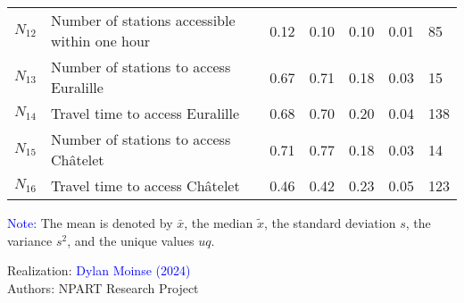 \begin{table}[h!]
{\begin{tabular}{p{}p{}p{}p{}p{}p{}p{}}
\small{\(N_{12}\)} & \small{Number of stations accessible within one hour} & \small{0.12} & \small{0.10} & \small{0.10} & \small{0.01} & \small{85}\\
\small{\(N_{13}\)} & \small{Number of stations to access Euralille} & \small{0.67} & \small{0.71} & \small{0.18} & \small{0.03} & \small{15}\\
\small{\(N_{14}\)} & \small{Travel time to access Euralille} & \small{0.68} & \small{0.70} & \small{0.20} & \small{0.04} & \small{138}\\
\small{\(N_{15}\)} & \small{Number of stations to access Châtelet} & \small{0.71} & \small{0.77} & \small{0.18} & \small{0.03} & \small{14}\\
\small{\(N_{16}\)} & \small{Travel time to access Châtelet} & \small{0.46} & \small{0.42} & \small{0.23} & \small{0.05} & \small{123}\\
        \hline
    \end{tabular}}
    \caption*{}
    \vspace{5pt}
        \begin{flushleft}\scriptsize{
        \textcolor{blue}{Note:} The mean is denoted by \(\bar{x}\), the median \(\tilde{x}\), the standard deviation \(s\), the variance \(s^2\), and the unique values \(uq\).
        }\end{flushleft}
        \begin{flushright}\scriptsize
        Realization: \textcolor{blue}{Dylan Moinse (2024)}
        \\
        Authors: \acrshort{NPART} Research Project
        \end{flushright}
        \end{table}